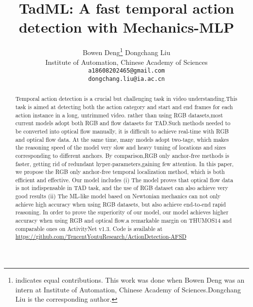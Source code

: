 \documentclass[10pt,twocolumn,letterpaper]{article}
\begin{document}
\title{TadML: A fast temporal action detection with Mechanics-MLP}



\author{
{
Bowen Deng\thanks{\* indicates equal contributions. This work was done when Bowen Deng was an intern at Institute of Automation, Chinese Academy of Sciences.Dongchang Liu is the corresponding author.}
\qquad
{Dongchang Liu}
}\\
Institute of Automation, Chinese Academy of Sciences\\
{\tt\small a18608202465@gmail.com}\\
{\tt\small dongchang.liu@ia.ac.cn}\\
}


\maketitle
\begin{abstract}
Temporal action detection is a crucial but challenging task in video understanding.This task is aimed at detecting both the action category and start and end frames for each action instance in a long, untrimmed video.
rather than using RGB datasets,most current models adopt both RGB and flow datasets for TAD.Such methods needed to be converted into optical flow manually, it is difficult to achieve real-time with RGB and optical flow data. At the same time, many models adopt two-tage, which makes the reasoning speed of the model very slow and heavy tuning of locations and sizes corresponding to different anchors.
By comparison,RGB only anchor-free methods is faster, getting rid of
redundant hyper-parameters,gaining few attention.
In this paper, we propose the RGB only anchor-free
temporal localization method, which is both efficient
and effective. Our model includes (i) The model proves that optical flow data is not indispensable in TAD task, and the use of RGB dataset can also achieve very good results (ii) The ML-like model based on Newtonian mechanics can not only achieve high accuracy when using RGB datasets, but also achieve end-to-end rapid reasoning. In order to prove the superiority of our model, our model achieves higher accuracy when using RGB and optical flow.a remarkable margin on THUMOS14 and comparable ones on ActivityNet v1.3. Code is available at \url{https://github.com/TencentYoutuResearch/ActionDetection-AFSD}
\end{abstract}
\end{document}
